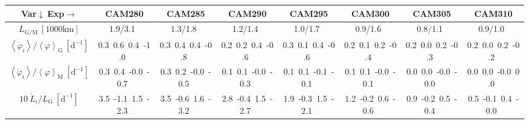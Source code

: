 \setlength\tabcolsep{1.5pt}

\begin{table}[H]
{\footnotesize
\begin{centering}
\begin{tabular}{|c|c|c|c|c|c|c|c|}
\hline
Var$\downarrow\ $Exp$\rightarrow$ & CAM280 & CAM285 & CAM290 & CAM295 & CAM300 & CAM305 & CAM310 \tabularnewline
\hline
\hline
$L_{\mathrm{G/M}}\ \left[1000\mathrm{km}\right]$ & 1.9/3.1\ & 1.3/1.8\ & 1.2/1.4\ & 1.0/1.7\ & 0.9/1.6\ & 0.8/1.1\ & 0.9/1.0\ \tabularnewline
\hline
$\left\langle \dot{\varphi}_{i}\right\rangle /\left\langle \varphi\right\rangle _{\mathrm{G}}\ \left[\mathrm{d^{-1}}\right]$ & \textcolor{C1}{0.3}\ \textcolor{C2}{0.6}\ \textcolor{C3}{0.4}\ \textcolor{C4}{-1.0}\  & \textcolor{C1}{0.3}\ \textcolor{C2}{0.4}\ \textcolor{C3}{0.4}\ \textcolor{C4}{-0.8}\  & \textcolor{C1}{0.2}\ \textcolor{C2}{0.2}\ \textcolor{C3}{0.4}\ \textcolor{C4}{-0.6}\  & \textcolor{C1}{0.3}\ \textcolor{C2}{0.1}\ \textcolor{C3}{0.4}\ \textcolor{C4}{-0.6}\  & \textcolor{C1}{0.2}\ \textcolor{C2}{0.1}\ \textcolor{C3}{0.2}\ \textcolor{C4}{-0.4}\  & \textcolor{C1}{0.2}\ \textcolor{C2}{0.0}\ \textcolor{C3}{0.2}\ \textcolor{C4}{-0.3}\  & \textcolor{C1}{0.2}\ \textcolor{C2}{0.0}\ \textcolor{C3}{0.2}\ \textcolor{C4}{-0.2}\  \tabularnewline
\hline
$\left\langle \dot{\varphi}_{i}\right\rangle /\left\langle \varphi\right\rangle _{\mathrm{M}}\ \left[\mathrm{d^{-1}}\right]$ & \textcolor{C1}{0.3}\ \textcolor{C2}{0.4}\ \textcolor{C3}{-0.0}\ \textcolor{C4}{-0.7}\  & \textcolor{C1}{0.3}\ \textcolor{C2}{0.2}\ \textcolor{C3}{-0.0}\ \textcolor{C4}{-0.5}\  & \textcolor{C1}{0.1}\ \textcolor{C2}{0.1}\ \textcolor{C3}{-0.0}\ \textcolor{C4}{-0.3}\  & \textcolor{C1}{0.1}\ \textcolor{C2}{0.1}\ \textcolor{C3}{-0.1}\ \textcolor{C4}{-0.1}\  & \textcolor{C1}{0.1}\ \textcolor{C2}{0.1}\ \textcolor{C3}{-0.0}\ \textcolor{C4}{-0.1}\  & \textcolor{C1}{0.0}\ \textcolor{C2}{0.0}\ \textcolor{C3}{-0.0}\ \textcolor{C4}{-0.0}\  & \textcolor{C1}{0.0}\ \textcolor{C2}{0.0}\ \textcolor{C3}{-0.0}\ \textcolor{C4}{0.0}\  \tabularnewline
\hline
$10\ \dot{L}_{i}/L_{\mathrm{G}}\ \left[\mathrm{d^{-1}}\right]$ & \textcolor{C1}{3.5}\ \textcolor{C2}{-1.1}\ \textcolor{C3}{1.5}\ \textcolor{C4}{-2.3}\  & \textcolor{C1}{3.5}\ \textcolor{C2}{-0.6}\ \textcolor{C3}{1.6}\ \textcolor{C4}{-3.2}\  & \textcolor{C1}{2.8}\ \textcolor{C2}{-0.4}\ \textcolor{C3}{1.5}\ \textcolor{C4}{-2.7}\  & \textcolor{C1}{1.9}\ \textcolor{C2}{-0.3}\ \textcolor{C3}{1.5}\ \textcolor{C4}{-2.1}\  & \textcolor{C1}{1.2}\ \textcolor{C2}{-0.2}\ \textcolor{C3}{0.6}\ \textcolor{C4}{-0.6}\  & \textcolor{C1}{0.9}\ \textcolor{C2}{-0.2}\ \textcolor{C3}{0.5}\ \textcolor{C4}{-0.4}\  & \textcolor{C1}{0.5}\ \textcolor{C2}{-0.1}\ \textcolor{C3}{0.4}\ \textcolor{C4}{-0.0}\  \tabularnewline

\end{tabular}
\end{centering}}
\end{table}
